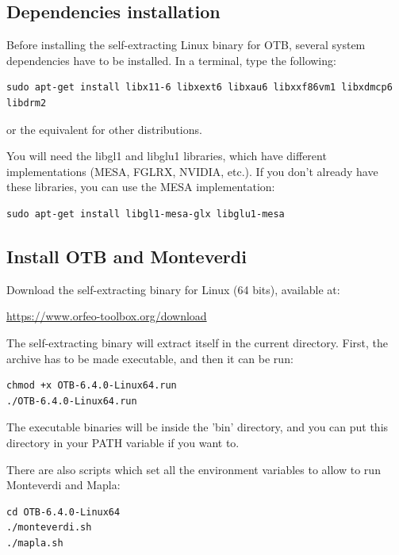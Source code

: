\documentclass[10pt,a4paper]{article}
\begin{document}
\subsection{Dependencies installation}
Before installing the self-extracting Linux binary for OTB, several system dependencies have to be installed. In a terminal, type the following:
\begin{verbatim}
sudo apt-get install libx11-6 libxext6 libxau6 libxxf86vm1 libxdmcp6 libdrm2
\end{verbatim}
or the equivalent for other distributions.

You will need the libgl1 and libglu1 libraries, which have different implementations (MESA, FGLRX, NVIDIA, etc.). If you don't already have these libraries, you can use the MESA implementation:
\begin{verbatim}
sudo apt-get install libgl1-mesa-glx libglu1-mesa
\end{verbatim}

\subsection{Install OTB and Monteverdi}
Download the self-extracting binary for Linux (64 bits), available at:
\begin{center}
\url{https://www.orfeo-toolbox.org/download}
\end{center}

The self-extracting binary will extract itself in the current directory. First, the archive has to be made executable, and then it can be run:
\begin{verbatim}
chmod +x OTB-6.4.0-Linux64.run
./OTB-6.4.0-Linux64.run
\end{verbatim}

The executable binaries will be inside the 'bin' directory, and you can put this directory in your PATH variable if you want to. 

There are also scripts which set all the environment variables to allow to run Monteverdi and Mapla:
\begin{verbatim}
cd OTB-6.4.0-Linux64
./monteverdi.sh
./mapla.sh
\end{verbatim}
\end{document}
